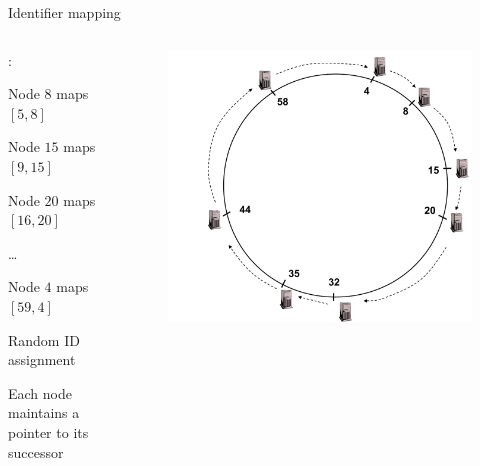 \begin{frame}{Identifier mapping}

\begin{columns}
\begin{column}{0.4\textwidth}
:
\BI
\item Node  $8$ maps $[5,8]$
\item Node $15$ maps $[9,15]$
\item Node $20$ maps $[16, 20]$
\item \ldots
\item Node $4$ maps $[59, 4]$
\EI

\bigskip
\BI
\item Random ID assignment
\item Each node maintains a pointer to its successor
\EI
\end{column}
\begin{column}{0.6\textwidth}
\begin{figure}
\includegraphics[width=1.0\textwidth]{figs/10/chord-example2}
\end{figure}
\end{column}
\end{columns}

\end{frame}

